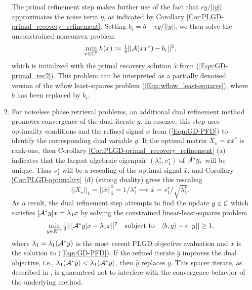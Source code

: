 \begin{enumerate}
The primal refinement step makes further use of the fact that $\epsilon y / ||y||$ approximates the noise term $\eta$, as indicated by Corollary \ref{Cor:PLGD-primal_recovery_refinement}.  Setting $b_\epsilon = b - \epsilon y / ||y||$, we then solve the unconstrained nonconvex problem
\begin{equation}	\label{Eqn:GD-PFD}
\begin{array}{l}
\min\limits_{\substack{x \in {\mathbb C}^n}} h(x) := \frac{1}{4}|| {\mathcal A}(x x^*) - b_\epsilon
||^2,
\end{array}
\end{equation}
which is initialized with the primal recovery solution $\hat{x}$ from (\ref{Eqn:GD-primal_rec2}).  This problem can be interpreted as a partially denoised version of the wflow least-squares problem (\ref{Eqn:wflow_least-squares}), where $b$ has been replaced by $b_\epsilon$.



\item
For noiseless phase retrieval problems, an additional dual refinement method promotes convergence of the dual iterate $y$.  In essence, this step uses optimality conditions and the refined signal $x$ from (\ref{Eqn:GD-PFD}) to identify the corresponding dual variable $y$.  If the optimal matrix $X_\star = \bar{x}\bar{x}^*$ is rank-one, then Corollary \ref{Cor:PLGD-primal_recovery_refinement} (a) indicates that the largest algebraic eigenpair $(\lambda_1^\star, v_1^\star)$ of ${\mathcal A}^*y_\star$ will be unique.  Thus $v_1^\star$ will be a rescaling of the optimal signal $\bar{x}$, and  Corollary \ref{Cor:PLGD-optimality} (d) (strong duality) gives this rescaling
\[
||X_\star||_1 = ||\bar{x}||_2^2 = 1/ \lambda_1^\star \implies \bar{x} = v_1^\star / \sqrt{\lambda_1^\star}.
\]  
As a result, the dual refinement step attempts to find the update $y \in {\mathcal C}$ which satisfies $ [{\mathcal A}^* y]x = \lambda_1 x$ by solving the constrained linear-least-squares problem
\begin{equation} 	\label{Eqn:GD-DFP}
\begin{array}{lcr}
\min\limits_{\substack{ y \in \mathbb{R}^m}} \frac{1}{2} || [{\mathcal A}^* y]x - \lambda_1 x ||^2
	&	\textnormal{subject to} 	&	 \langle b, y \rangle - \epsilon ||y|| \geq 1,
\end{array}
\end{equation}
where $\lambda_1 = \lambda_1 ({\mathcal A}^*y)$ is the most recent PLGD objective evaluation and $x$ is the solution to (\ref{Eqn:GD-PFD}).  If the refined iterate $\hat{y}$ improves the dual objective, i.e., $\lambda_1 ({\mathcal A}^*\hat{y}) < \lambda_1 ({\mathcal A}^*y)$, then $\hat{y}$ replaces $y$.  This spacer iterate, as described in \cite[Proposition 1.2.5]{bertsekas2016nonlinear}, is guaranteed not to interfere with the convergence behavior of the underlying method.




\end{enumerate}
